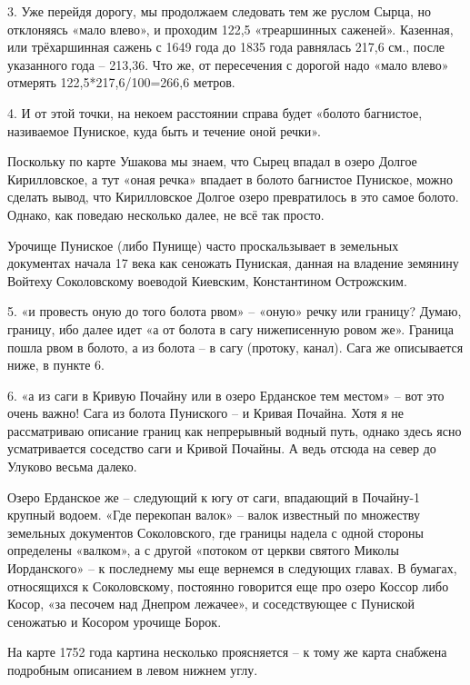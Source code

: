 3. Уже перейдя дорогу, мы продолжаем следовать тем же руслом Сырца, но отклоняясь «мало влево», и проходим 122,5 «треаршинных саженей». Казенная, или трёхаршинная сажень с 1649 года до 1835 года равнялась 217,6 см., после указанного года – 213,36. Что же, от пересечения с дорогой надо «мало влево» отмерять 122,5*217,6/100=266,6 метров.

4. И от этой точки, на некоем расстоянии справа будет «болото багнистое, називаемое Пуниское, куда быть и течение оной речки».

Поскольку по карте Ушакова мы знаем, что Сырец впадал в озеро Долгое Кирилловское, а тут «оная речка» впадает в болото багнистое Пуниское, можно сделать вывод, что Кирилловское Долгое озеро превратилось в это самое болото. Однако, как поведаю несколько далее, не всё так просто.

Урочище Пуниское (либо Пунище) часто проскальзывает в земельных документах начала 17 века как сеножать Пуниская, данная на владение земянину Войтеху Соколовскому воеводой Киевским, Константином Острожским.

5. «и провесть оную до того болота рвом» – «оную» речку или границу? Думаю, границу, ибо далее идет «а от болота в сагу нижеписенную ровом же». Граница пошла рвом в болото, а из болота – в сагу (протоку, канал). Сага же описывается ниже, в пункте 6.

6. «а из саги в Кривую Почайну или в озеро Ерданское тем местом» – вот это очень важно! Сага из болота Пуниского – и Кривая Почайна. Хотя я не рассматриваю описание границ как непрерывный водный путь, однако здесь ясно усматривается соседство саги и Кривой Почайны. А ведь отсюда на север до Улуково весьма далеко.

Озеро Ерданское же – следующий к югу от саги, впадающий в Почайну-1 крупный водоем. «Где перекопан валок» – валок известный по множеству земельных документов Соколовского, где границы надела с одной стороны определены «валком», а с другой «потоком от церкви святого Миколы Иорданского» – к последнему мы еще вернемся в следующих главах. В бумагах, относящихся к Соколовскому, постоянно говорится еще про озеро Коссор либо Косор, «за песочем над Днепром лежачее», и соседствующее с Пуниской сеножатью и Косором урочище Борок.

На карте 1752 года картина несколько проясняется – к тому же карта снабжена подробным описанием в левом нижнем углу.

